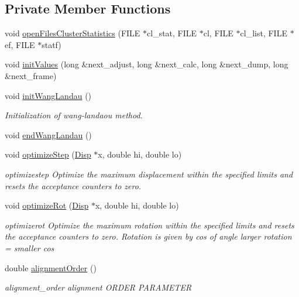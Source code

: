 \subsection*{Private Member Functions}
\begin{DoxyCompactItemize}
\item 
void \hyperlink{class_updater_acccf7211cd6f50fa2e6204f9a722c507}{open\+Files\+Cluster\+Statistics} (F\+I\+L\+E $\ast$cl\+\_\+stat, F\+I\+L\+E $\ast$cl, F\+I\+L\+E $\ast$cl\+\_\+list, F\+I\+L\+E $\ast$ef, F\+I\+L\+E $\ast$statf)
\item 
void \hyperlink{class_updater_a5184acd8355081cf34a024ea24c89fac}{init\+Values} (long \&next\+\_\+adjust, long \&next\+\_\+calc, long \&next\+\_\+dump, long \&next\+\_\+frame)
\item 
void \hyperlink{class_updater_a76445be97c06ecf75daa9bdf01f4799d}{init\+Wang\+Landau} ()
\begin{DoxyCompactList}\small\item\em Initialization of wang-\/landaou method. \end{DoxyCompactList}\item 
void \hyperlink{class_updater_ad430c652adde7c1b42f5a928da48c64c}{end\+Wang\+Landau} ()
\item 
void \hyperlink{class_updater_af25a87eb3106bf56c480aadaddf01204}{optimize\+Step} (\hyperlink{class_disp}{Disp} $\ast$x, double hi, double lo)
\begin{DoxyCompactList}\small\item\em optimizestep Optimize the maximum displacement within the specified limits and resets the acceptance counters to zero. \end{DoxyCompactList}\item 
void \hyperlink{class_updater_ad338fbf16ab7c900490a94321fe865f3}{optimize\+Rot} (\hyperlink{class_disp}{Disp} $\ast$x, double hi, double lo)
\begin{DoxyCompactList}\small\item\em optimizerot Optimize the maximum rotation within the specified limits and resets the acceptance counters to zero. Rotation is given by cos of angle larger rotation = smaller cos \end{DoxyCompactList}\item 
double \hyperlink{class_updater_ac2c6869c4c7dd8d977e83997fb6ab345}{alignment\+Order} ()
\begin{DoxyCompactList}\small\item\em alignment\+\_\+order alignment O\+R\+D\+E\+R P\+A\+R\+A\+M\+E\+T\+E\+R \end{DoxyCompactList}\item 

\end{DoxyCompactItemize}
